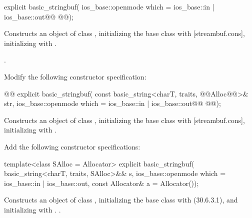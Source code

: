 \documentclass[ebook,11pt,article]{memoir}
\newcommand{\iref}[1]{[#1]}
\begin{document}
\begin{itemdecl}
explicit basic_stringbuf(
  ios_base::openmode which = ios_base::in | ios_base::out@\added{,}@
  @@);
\end{itemdecl}

\begin{itemdescr}
\pnum
\effects
Constructs an object of class
,
initializing the base class with
\iref{streambuf.cons},  initializing
with .

\pnum
\postconditions
{}.
\end{itemdescr}

Modify the following constructor specification:
\begin{itemdecl}
@@
explicit basic_stringbuf(
  const basic_string<charT, traits, @@Alloc@@>& str,
  ios_base::openmode which = ios_base::in | ios_base::out@\added{,}@
  @@);
\end{itemdecl}

\begin{itemdescr}
\pnum
\effects
Constructs an object of class
,
initializing the base class with
\iref{streambuf.cons},  initializing
with .
\end{itemdescr}

Add the following constructor specifications:

\begin{insrt}
\begin{itemdecl}
template<class SAlloc = Allocator>
explicit basic_stringbuf(
  basic_string<charT, traits, SAlloc>&& s,
  ios_base::openmode which = ios_base::in | ios_base::out,
  const Allocator\& a = Allocator());
\end{itemdecl}
\begin{itemdescr}
\pnum
\effects Constructs an object of class , initializing the base class with  (30.6.3.1), and initializing  with . 
.
\end{itemdescr}
\end{insrt}
\end{document}
